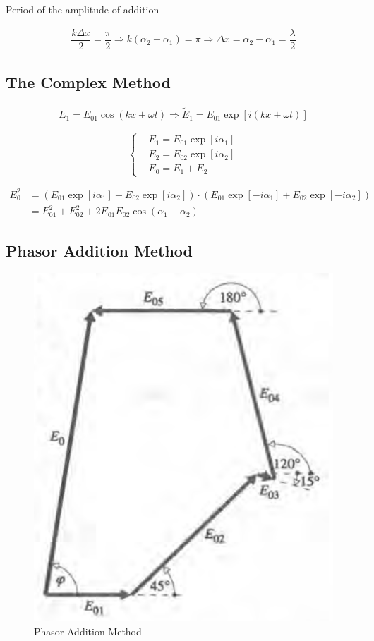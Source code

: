 Period of the amplitude of addition

\begin{equation*}
  \begin{aligned}
    \dfrac{k \Delta x}{2} = \dfrac{\pi}{2}  \Rightarrow k \left( \alpha_2 - \alpha_1 \right) = \pi \Rightarrow \Delta x = \alpha_2 - \alpha_1 = \dfrac{\lambda}{2} 
  \end{aligned}
\end{equation*}

\subsection{The Complex Method}

\begin{equation*}
  \begin{aligned}
    E_1 = E_{01} \cos \left( kx \pm \omega t \right) \Rightarrow \tilde{E}_1 = E_{01} \exp \left[ i \left( k x \pm \omega t \right) \right]
  \end{aligned}
\end{equation*}

\begin{equation*}
  \left\{
    \begin{aligned}
      & E_1 = E_{01} \exp \left[ i \alpha_1 \right] \\
      & E_2 = E_{02} \exp \left[ i \alpha_2 \right] \\
      & E_0 = E_1 + E_2
    \end{aligned}
  \right.
\end{equation*}

\begin{equation*}
  \begin{aligned}
    E_0^2 &= \left( E_{01} \exp \left[ i \alpha_1 \right] + E_{02} \exp \left[ i \alpha_2 \right] \right) \cdot \left( E_{01} \exp \left[ - i \alpha_1 \right] + E_{02} \exp \left[ - i \alpha_2 \right] \right) \\
    &= E_{01}^2 + E_{02}^2 + 2 E_{01} E_{02} \cos \left( \alpha_1 - \alpha_2 \right)
  \end{aligned}
\end{equation*}

\subsection{Phasor Addition Method}

\begin{figure}[H]
  \centering
  \includegraphics[width=0.3\linewidth]{figures/Phasor-Addition}
  \caption{Phasor Addition Method}
  \label{fig:}
\end{figure}

